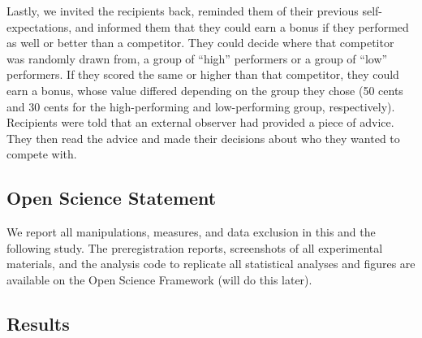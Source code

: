 \documentclass[
  man,floatsintext]{apa6}
\begin{document}
Lastly, we invited the recipients back, reminded them of their previous self-expectations, and informed them that they could earn a bonus if they performed as well or better than a competitor. They could decide where that competitor was randomly drawn from, a group of ``high'' performers or a group of ``low'' performers. If they scored the same or higher than that competitor, they could earn a bonus, whose value differed depending on the group they chose (50 cents and 30 cents for the high-performing and low-performing group, respectively). Recipients were told that an external observer had provided a piece of advice. They then read the advice and made their decisions about who they wanted to compete with.

\hypertarget{open-science-statement}{%
\subsection{Open Science Statement}\label{open-science-statement}}

We report all manipulations, measures, and data exclusion in this and the following study.
The preregistration reports, screenshots of all experimental materials, and
the analysis code to replicate all statistical analyses and figures are
available on the Open Science Framework (will do this later).

\hypertarget{results}{%
\subsection{Results}\label{results}}
\end{document}
